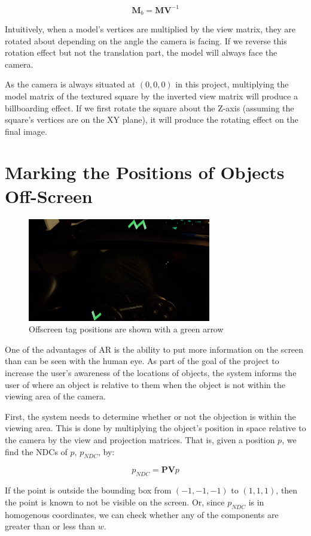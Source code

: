 \[ \textbf{M}_b = \textbf{M} \textbf{V}^{-1} \]

Intuitively, when a model's vertices are multiplied by the view matrix, they are rotated about depending on the angle the camera is facing. If we reverse this rotation effect but not the translation part, the model will always face the camera.

As the camera is always situated at $(0, 0, 0)$ in this project, multiplying the model matrix of the textured square by the inverted view matrix will produce a billboarding effect. If we first rotate the square about the Z-axis (assuming the square's vertices are on the XY plane), it will produce the rotating effect on the final image.

\section{Marking the Positions of Objects Off-Screen}

\begin{figure}
	\centering
	\includegraphics[width=8cm]{Figures/OffscreenPositions1.png}
	\decoRule
	\caption{Offscreen tag positions are shown with a green arrow}
	\label{fig:Arrow}
\end{figure}

One of the advantages of AR is the ability to put more information on the screen than can be seen with the human eye. As part of the goal of the project to increase the user's awareness of the locations of objects, the system informs the user of where an object is relative to them when the object is not within the viewing area of the camera.

First, the system needs to determine whether or not the objection is within the viewing area. This is done by multiplying the object's position in space relative to the camera by the view and projection matrices. That is, given a position $p$, we find the NDCs of $p$, $p_{NDC}$, by:

\[ p_{NDC} = \mathbf{P} \mathbf{V} p \]

If the point is outside the bounding box from $(-1, -1, -1)$ to $(1, 1, 1)$, then the point is known to not be visible on the screen. Or, since $p_{NDC}$ is in homogenous coordinates, we can check whether any of the components are greater than or less than $w$.

